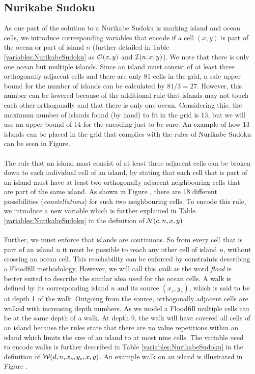\subsection{Nurikabe Sudoku}
As one part of the solution to a Nurikabe Sudoku is marking island and ocean cells, we introduce corresponding variables that encode if a cell $(x,y)$ is part of the ocean or part of island $n$ (further detailed in  Table \ref{variables:NurikabeSudoku} as $\mathcal{O}(x,y)$ and  $\mathcal{I}(n,x,y)$). We note that there is only one ocean but multiple islands. Since an island must consist of at least three orthogonally adjacent cells and there are only 81 cells in the grid, a safe upper bound for the number of islands can be calculated by $81/3=27$. However, this number can be lowered because of the additional rule that islands may not touch each other orthogonally and that there is only one ocean. Considering this, the maximum number of islands found (by hand) to fit in the grid is 13, but we will use an upper bound of 14 for the encoding just to be sure. An example of how 13 islands can be placed in the grid that complies with the rules of Nurikabe Sudoku can be seen in Figure.\\
\\
The rule that an island must consist of at least three adjacent cells can be broken down to each individual cell of an island, by stating that each cell that is part of an island must have at least two orthogonally adjacent neighbouring cells that are part of the same island. As shown in Figure , there are 18 different possibilities (\emph{constellations}) for such two neighbouring cells. To encode this rule, we introduce a new variable which is further explained in Table \ref{variables:NurikabeSudoku} in the definition of $\mathcal{N}(c,n,x,y)$.\\
\\
Further, we must enforce that islands are continuous. So from every cell that is part of an island  $n$ it must be possible to reach any other cell of island $n$, without crossing an ocean cell. This reachability can be enforced by constraints describing a Floodfill methodology. However, we will call this \emph{walk} as the word \emph{flood} is better suited to describe the similar idea used for the ocean cells. A walk is defined by its corresponding island $n$ and its source $(x_s,y_s)$, which is said to be at depth 1 of the walk. Outgoing from the source, orthogonally adjacent cells are walked with increasing depth numbers. As we model a Floodfill multiple cells can be at the same depth of a walk. At depth 9, the walk will have covered all cells of an island because the rules state that there are no value repetitions within an island which limits the size of an island to at most nine cells. The variable used to encode walks is further described in Table \ref{variables:NurikabeSudoku} in the definition of $\mathcal{W}(d,n,x_s,y_s,x,y)$. An example walk on an island is illustrated in Figure .\\

